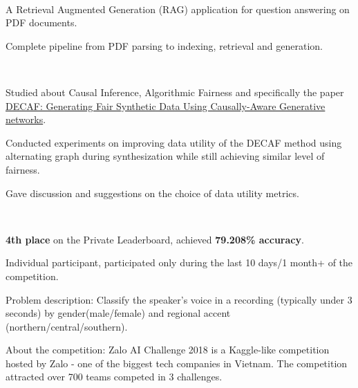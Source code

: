 \\
\begin{xitemize}
    \item A Retrieval Augmented Generation (RAG) application for question answering on PDF
    documents.
    \item Complete pipeline from PDF parsing to indexing, retrieval and generation.
\end{xitemize}


\\
\begin{xitemize}
    \item Studied about Causal Inference, Algorithmic Fairness and specifically the paper \href{https://arxiv.org/abs/2110.12884}{DECAF: Generating Fair Synthetic Data Using Causally-Aware Generative networks}.
    \item Conducted experiments on improving data utility of the DECAF method using alternating graph during synthesization while still achieving similar level of  fairness.
    \item Gave discussion and suggestions on the choice of data utility metrics.
\end{xitemize}

\\
\begin{xitemize}
    \item \textbf{4th place} on the Private Leaderboard, achieved \textbf{79.208\% accuracy}.
    \item Individual participant, participated only during the last 10 days/1 month+ of
    the competition.
    \item Problem description: Classify the speaker's voice in a recording (typically
    under 3 seconds) by gender(male/female) and regional accent (northern/central/southern).
    \item About the competition: Zalo AI Challenge 2018 is a Kaggle-like competition hosted
    by Zalo - one of the biggest tech companies in Vietnam. The competition attracted
    over 700 teams competed in 3 challenges.
\end{xitemize}

